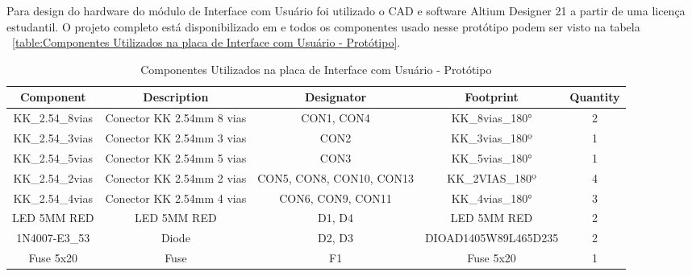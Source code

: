 \documentclass[../delivery_hospital_report.tex]{subfiles}
\begin{document}
Para design do hardware do módulo de Interface com Usuário foi utilizado o CAD e software Altium Designer 21 \cite{altium21} a partir de uma licença estudantil. O projeto completo está disponibilizado em \cite{github_modulos} e todos os componentes usado nesse protótipo podem ser visto na tabela ~\ref{table:Componentes Utilizados na placa de Interface com Usuário - Protótipo}.

\begin{table}[!ht]
\caption{Componentes Utilizados na placa de Interface com Usuário - Protótipo}
\centering
\begin{adjustbox}{width=\columnwidth,center}
\begin{tabular}{|c|c|c|c|c|}
\hline
Component                   & Description                                    & Designator                             & Footprint                   & Quantity \\ \hline
KK\_2.54\_8vias             & Conector KK 2.54mm 8   vias                    & CON1, CON4                             & KK\_8vias\_180°             & 2        \\ \hline
KK\_2.54\_3vias             & Conector KK 2.54mm 3   vias                    & CON2                                   & KK\_3vias\_180º             & 1        \\ \hline
KK\_2.54\_5vias             & Conector KK 2.54mm 5   vias                    & CON3                                   & KK\_5vias\_180°             & 1        \\ \hline
KK\_2.54\_2vias             & Conector KK 2.54mm 2   vias                    & CON5, CON8, CON10,   CON13             & KK\_2VIAS\_180º             & 4        \\ \hline
KK\_2.54\_4vias             & Conector KK 2.54mm 4   vias                    & CON6, CON9, CON11                      & KK\_4vias\_180°             & 3        \\ \hline
LED 5MM RED                 & LED 5MM RED                                    & D1, D4                                 & LED 5MM RED                 & 2        \\ \hline
1N4007-E3\_53               & Diode                                          & D2, D3                                 & DIOAD1405W89L465D235        & 2        \\ \hline
Fuse 5x20                   & Fuse                                           & F1                                     & Fuse 5x20                   & 1        \\ \hline

\end{tabular}
\end{adjustbox}
\end{table}
\end{document}
